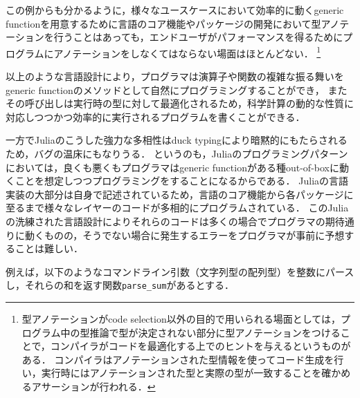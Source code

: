 この例からも分かるように，様々なユースケースにおいて効率的に動くgeneric functionを用意するために言語のコア機能やパッケージの開発において型アノテーションを行うことはあっても，エンドユーザがパフォーマンスを得るためにプログラムにアノテーションをしなくてはならない場面はほとんどない．
\footnote{
  型アノテーションがcode selection以外の目的で用いられる場面としては，プログラム中の型推論で型が決定されない部分に型アノテーションをつけることで，コンパイラがコードを最適化する上でのヒントを与えるというものがある\cite{type-annotation}．
  コンパイラはアノテーションされた型情報を使ってコード生成を行い，実行時にはアノテーションされた型と実際の型が一致することを確かめるアサーションが行われる．
}

以上のような言語設計により，プログラマは演算子や関数の複雑な振る舞いをgeneric functionのメソッドとして自然にプログラミングすることができ\footnotemark，
またその呼び出しは実行時の型に対して最適化されるため，科学計算の動的な性質に対応しつつかつ効率的に実行されるプログラムを書くことができる．


\vspace{1ex}

一方でJuliaのこうした強力な多相性はduck typingにより暗黙的にもたらされるため，バグの温床にもなりうる．
というのも，Juliaのプログラミングパターンにおいては，良くも悪くもプログラマはgeneric functionがある種out-of-boxに動くことを想定しつつプログラミングをすることになるからである．
Juliaの言語実装の大部分は自身で記述されているため，言語のコア機能から各パッケージに至るまで様々なレイヤーのコードが多相的にプログラムされている．
このJuliaの洗練された言語設計によりそれらのコードは多くの場合でプログラマの期待通りに動くものの，そうでない場合に発生するエラーをプログラマが事前に予想することは難しい．

例えば，以下のようなコマンドライン引数（文字列型の配列型）を整数にパースし，それらの和を返す関数\texttt{parse\_sum}があるとする．

